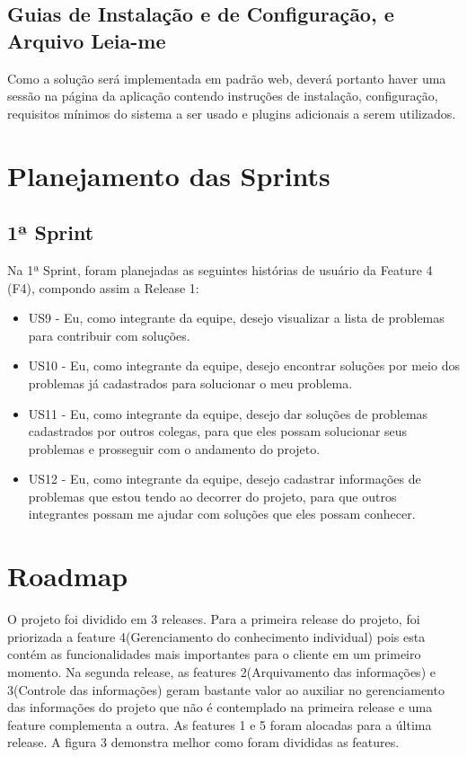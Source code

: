 \subsection{Guias de Instalação e de Configuração, e Arquivo Leia-me}
Como a solução será implementada em padrão web, deverá portanto haver uma sessão na página da aplicação contendo instruções de instalação, configuração, requisitos mínimos do sistema a ser usado e plugins adicionais a serem utilizados.

\section{Planejamento das Sprints}
\subsection{1ª Sprint}
Na 1ª Sprint, foram planejadas as seguintes histórias de usuário da Feature 4 (F4), compondo assim a Release 1:
\begin{itemize}
\item US9 - Eu, como integrante da equipe, desejo visualizar a lista de problemas para contribuir com soluções.
\item US10 - Eu, como integrante da equipe, desejo encontrar soluções por meio dos problemas já cadastrados para solucionar o meu problema.
\item US11 - Eu, como integrante da equipe, desejo dar soluções de problemas cadastrados por outros colegas, para que eles possam solucionar seus problemas e prosseguir com o andamento do projeto.
\item US12 - Eu, como integrante da equipe, desejo cadastrar informações de problemas que estou tendo ao decorrer do projeto, para que outros integrantes possam me ajudar com soluções que eles possam conhecer.
\end{itemize}

\section{Roadmap}
O projeto foi dividido em 3 releases. Para a primeira release do projeto, foi priorizada a feature 4(Gerenciamento do conhecimento individual) pois esta contém as funcionalidades mais importantes para o cliente em um primeiro momento. Na segunda release, as features 2(Arquivamento das informações) e 3(Controle das informações) geram bastante valor ao auxiliar no gerenciamento das informações do projeto que não é contemplado na primeira release e uma feature complementa a outra. As features 1 e 5 foram alocadas para a última release. A figura 3 demonstra melhor como foram divididas as features.\\

